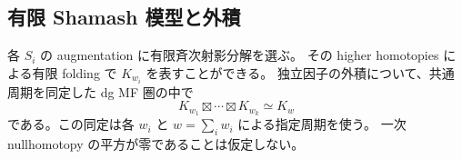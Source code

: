 \subsection{有限 Shamash 模型と外積}

\begin{lemma}
\label{mbnp:lem:shamash}
各 $S_i$ の augmentation に有限斉次射影分解を選ぶ。
その higher homotopies による有限 folding で $K_{w_i}$ を表すことができる。
独立因子の外積について、共通周期を同定した dg MF 圏の中で
\begin{equation}\label{mbnp:eq:augmentation-product}
 K_{w_1}\boxtimes\cdots\boxtimes K_{w_k}\simeq K_w
\end{equation}
である。この同定は各 $w_i$ と $w=\sum_iw_i$ による指定周期を使う。
一次 nullhomotopy の平方が零であることは仮定しない。
\end{lemma}
